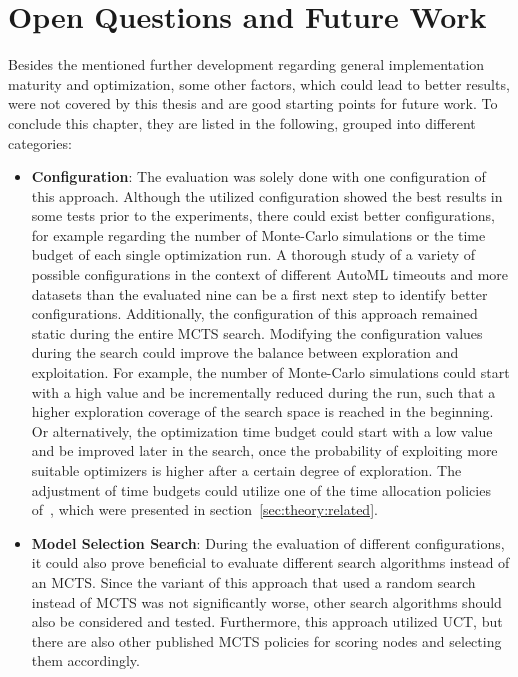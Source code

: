 \section{Open Questions and Future Work}
Besides the mentioned further development regarding general implementation maturity and optimization, some other factors, which could lead to better results, were not covered by this thesis and are good starting points for future work.
To conclude this chapter, they are listed in the following, grouped into different categories:
\begin{itemize}
    \item \textbf{Configuration}: The evaluation was solely done with one configuration of this approach.
    Although the utilized configuration showed the best results in some tests prior to the experiments, there could exist better configurations, for example regarding the number of Monte-Carlo simulations or the time budget of each single optimization run.
    A thorough study of a variety of possible configurations in the context of different AutoML timeouts and more datasets than the evaluated nine can be a first next step to identify better configurations.\newline
    Additionally, the configuration of this approach remained static during the entire MCTS search.
    Modifying the configuration values during the search could improve the balance between exploration and exploitation.
    For example, the number of Monte-Carlo simulations could start with a high value and be incrementally reduced during the run, such that a higher exploration coverage of the search space is reached in the beginning.
    Or alternatively, the optimization time budget could start with a low value and be improved later in the search, once the probability of exploiting more suitable optimizers is higher after a certain degree of exploration.
    The adjustment of time budgets could utilize one of the time allocation policies of~\textcite{Quemy-Two-Stage-Optimization}, which were presented in section~\ref{sec:theory:related}.
    \item \textbf{Model Selection Search}: During the evaluation of different configurations, it could also prove beneficial to evaluate different search algorithms instead of an MCTS.
    Since the variant of this approach that used a random search instead of MCTS was not significantly worse, other search algorithms should also be considered and tested.\newline
    Furthermore, this approach utilized UCT, but there are also other published MCTS policies for scoring nodes and selecting them accordingly.

\end{itemize}
